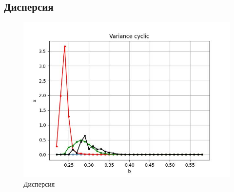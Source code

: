 \subsection{Дисперсия}

        
    \begin{figure}
        \centering
        \includegraphics[width=\textwidth]{stochastic/images/variance_cyclic.jpg}
        
        \captionsetup{justification=centering}
        \caption{Дисперсия}
        \label{variance_cyclic}
    \end{figure}